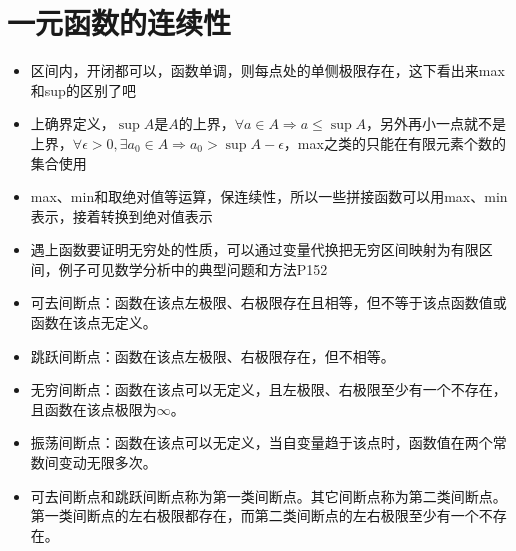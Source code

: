 \documentclass[UTF8]{ctexart}
\begin{document}
\section{一元函数的连续性}
\begin{itemize}

\item 区间内，开闭都可以，函数单调，则每点处的单侧极限存在，这下看出来max和sup的区别了吧

\item 上确界定义，$\sup A$是$A$的上界，$\forall a\in A \Rightarrow a\leq \sup A$，另外再小一点就不是上界，$\forall \epsilon >0,\exists a_0\in A\Rightarrow a_0>\sup A-\epsilon$，max之类的只能在有限元素个数的集合使用

\item max、min和取绝对值等运算，保连续性，所以一些拼接函数可以用max、min表示，接着转换到绝对值表示

\item 遇上函数要证明无穷处的性质，可以通过变量代换把无穷区间映射为有限区间，例子可见数学分析中的典型问题和方法P152

\item 可去间断点：函数在该点左极限、右极限存在且相等，但不等于该点函数值或函数在该点无定义。

\item 跳跃间断点：函数在该点左极限、右极限存在，但不相等。

\item 无穷间断点：函数在该点可以无定义，且左极限、右极限至少有一个不存在，且函数在该点极限为$\infty$。

\item 振荡间断点：函数在该点可以无定义，当自变量趋于该点时，函数值在两个常数间变动无限多次。

\item 可去间断点和跳跃间断点称为第一类间断点。其它间断点称为第二类间断点。第一类间断点的左右极限都存在，而第二类间断点的左右极限至少有一个不存在。
\end{itemize}
\end{document}
